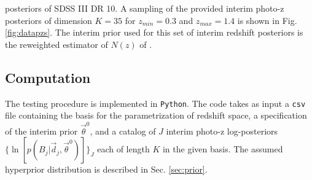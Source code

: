 \documentclass[preprint]{aastex}
\begin{document}
%
posteriors of SDSS III DR 10.  A sampling of the provided interim photo-z 
posteriors of dimension $K=35$ for $z_{min}=0.3$ and $z_{max}=1.4$ is shown in 
Fig. \ref{fig:datapzs}.  The interim prior used for this set of interim 
redshift posteriors is the reweighted estimator of $N(z)$ of 
\citet{Sheldon2012}.
%

\clearpage
\subsection{Computation}
\label{sec:mcmc}

The testing procedure is implemented in \texttt{Python}.  The code takes as 
input a \texttt{csv} file containing the basis for the parametrization of 
redshift space, a specification of the interim prior $\vec{\theta}^{0}$, and a 
catalog of $J$ interim photo-z log-posteriors 
$\{\ln[p(B_{j}|\vec{d}_{j},\vec{\theta}^{0})]\}_{J}$ each of length $K$ in the 
given basis.  The assumed hyperprior distribution is described in Sec. 
\ref{sec:prior}.
\end{document}
